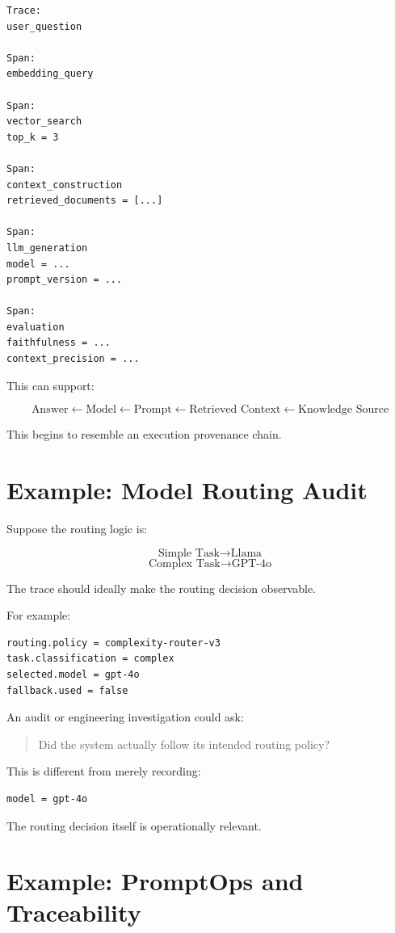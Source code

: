 \documentclass[11pt,a4paper]{article}
\begin{document}
\begin{lstlisting}
Trace:
user_question

Span:
embedding_query

Span:
vector_search
top_k = 3

Span:
context_construction
retrieved_documents = [...]

Span:
llm_generation
model = ...
prompt_version = ...

Span:
evaluation
faithfulness = ...
context_precision = ...
\end{lstlisting}

This can support:

\[
\text{Answer} \leftarrow \text{Model} \leftarrow \text{Prompt} \leftarrow \text{Retrieved Context} \leftarrow \text{Knowledge Source}
\]

This begins to resemble an execution provenance chain.

\section{Example: Model Routing Audit}

Suppose the routing logic is:

\[
\text{Simple Task} \rightarrow \text{Llama}
\]
\[
\text{Complex Task} \rightarrow \text{GPT-4o}
\]

The trace should ideally make the routing decision observable.

For example:

\begin{lstlisting}
routing.policy = complexity-router-v3
task.classification = complex
selected.model = gpt-4o
fallback.used = false
\end{lstlisting}

An audit or engineering investigation could ask:

\begin{quote}
Did the system actually follow its intended routing policy?
\end{quote}

This is different from merely recording:

\begin{lstlisting}
model = gpt-4o
\end{lstlisting}

The routing decision itself is operationally relevant.

\section{Example: PromptOps and Traceability}
\end{document}
